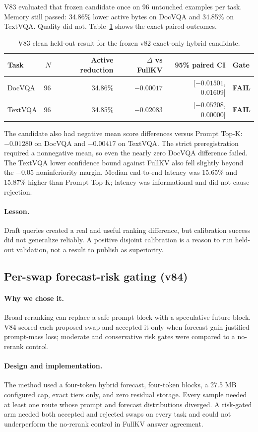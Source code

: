 \documentclass[11pt]{article}
\newcommand{\fail}{\textcolor{mkred}{\textbf{FAIL}}}
\newcommand{\lesson}{\paragraph{Lesson.}}
\newcommand{\reason}{\paragraph{Why we chose it.}}
\newcommand{\design}{\paragraph{Design and implementation.}}
\begin{document}
V83 evaluated that frozen candidate once on 96 untouched examples per task.  Memory still passed:
34.86\% lower active bytes on DocVQA and 34.85\% on TextVQA.  Quality did not.  Table~\ref{tab:v83}
shows the exact paired outcomes.

\begin{table}[ht]
\centering
\small
\caption{V83 clean held-out result for the frozen v82 exact-only hybrid candidate.}
\label{tab:v83}
\begin{tabular}{lrrrrl}
\toprule
Task & $N$ & Active reduction & $\Delta$ vs FullKV & 95\% paired CI & Gate \\
\midrule
DocVQA & 96 & 34.86\% & $-0.00017$ & [$-0.01501$, 0.01609] & \fail \\
TextVQA & 96 & 34.85\% & $-0.02083$ & [$-0.05208$, 0.00000] & \fail \\
\bottomrule
\end{tabular}
\end{table}

The candidate also had negative mean score differences versus Prompt Top-K: $-0.01280$ on DocVQA
and $-0.00417$ on TextVQA.  The strict preregistration required a nonnegative mean, so even the
nearly zero DocVQA difference failed.  The TextVQA lower confidence bound against FullKV also fell
slightly beyond the $-0.05$ noninferiority margin.  Median end-to-end latency was 15.65\% and
15.87\% higher than Prompt Top-K; latency was informational and did not cause rejection.

\lesson
Draft queries created a real and useful ranking difference, but calibration success did not
generalize reliably.  A positive disjoint calibration is a reason to run held-out validation, not
a result to publish as superiority.

\subsection{Per-swap forecast-risk gating (v84)}

\reason
Broad reranking can replace a safe prompt block with a speculative future block.  V84 scored each
proposed swap and accepted it only when forecast gain justified prompt-mass loss; moderate and
conservative risk gates were compared to a no-rerank control.

\design
The method used a four-token hybrid forecast, four-token blocks, a 27.5 MB configured cap, exact
tiers only, and zero residual storage.  Every sample needed at least one route whose prompt and
forecast distributions diverged.  A risk-gated arm needed both accepted and rejected swaps on
every task and could not underperform the no-rerank control in FullKV answer agreement.
\end{document}
